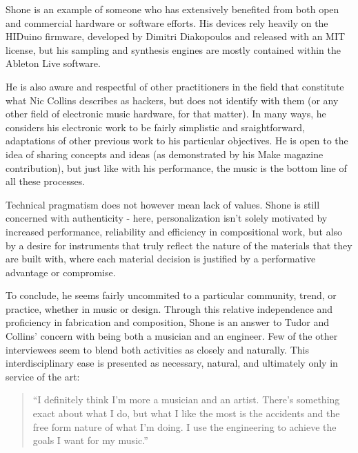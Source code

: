 Shone is an example of someone who has extensively benefited from both open and commercial hardware or software efforts. His devices rely heavily on the HIDuino firmware, developed by Dimitri Diakopoulos and released with an MIT license, but his sampling and synthesis engines are mostly contained within the Ableton Live software. 

He is also aware and respectful of other practitioners in the field that constitute what Nic Collins describes as hackers, but does not identify with them (or any other field of electronic music hardware, for that matter). In many ways, he considers his electronic work to be fairly simplistic and sraightforward, adaptations of other previous work to his particular objectives. He is open to the idea of sharing concepts and ideas (as demonstrated by his Make magazine contribution), but just like with his performance, the music is the bottom line of all these processes. 

Technical pragmatism does not however mean lack of values. Shone is still concerned with authenticity - here, personalization isn't solely motivated by increased performance, reliability and efficiency in compositional work, but also by a desire for instruments that truly reflect the nature of the materials that they are built with, where each material decision is justified by a performative advantage or compromise. 

To conclude, he seems fairly uncommited to a particular community, trend, or practice, whether in music or design. Through this relative independence and proficiency in fabrication and composition, Shone is an answer to Tudor and Collins' concern with being both a musician and an engineer. Few of the other interviewees seem to blend both activities as closely and naturally. This interdisciplinary ease is presented as necessary, natural, and ultimately only in service of the art:

\begin{quote}
	
	``I definitely think I'm more a musician and an artist. There's something exact about what I do, but what I like the most is the accidents and the free form nature of what I'm doing. I use the engineering to achieve the goals I want for my music.''
	
	\end{quote}


